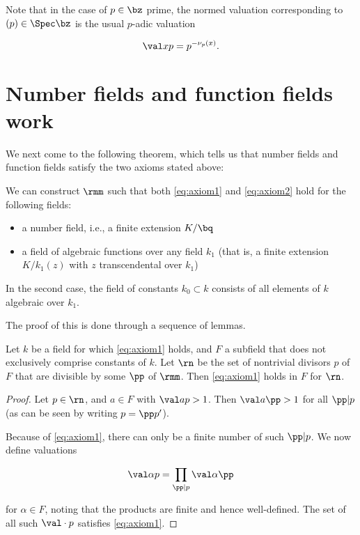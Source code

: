 Note that in the case of $p\in\bz$ prime, the normed valuation corresponding to
$(p)\in\Spec\bz$ is the usual $p$-adic valuation

\[ \val x p = p^{-\nu_p(x)}. \]

\section{Number fields and function fields work}
We next come to the following theorem, which tells us that number fields and
function fields satisfy the two axioms stated above:

\begin{thm}
  \label{thm:works}
  We can construct $\rmm$ such that both \ref{eq:axiom1} and \ref{eq:axiom2} hold
  for the following fields:
  \begin{itemize}
  \item a number field, i.e., a finite extension $K/\bq$
  \item a field of algebraic functions over any field $k_1$ (that is, a finite
    extension $K/k_1(z)$ with $z$ transcendental over $k_1$)
  \end{itemize}
  In the second case, the field of constants $k_0 \subset k$ consists of all
  elements of $k$ algebraic over $k_1$.
\end{thm}

The proof of this is done through a sequence of lemmas.

\begin{lemma}
  Let $k$ be a field for which \ref{eq:axiom1} holds, and $F$ a subfield that
  does not exclusively comprise constants of $k$. Let $\rn$ be the set of
  nontrivial divisors $p$ of $F$ that are divisible by some $\pp$ of $\rmm$.
  Then \ref{eq:axiom1} holds in $F$ for $\rn$.
\end{lemma}

\begin{proof}
  Let $p \in\rn$, and $a\in F$ with $\val a p > 1$. Then $\val a \pp > 1$ for all
  $\pp|p$ (as can be seen by writing $p = \pp p'$).

  Because of \ref{eq:axiom1}, there can only be a finite number of such
  $\pp|p$. We now define valuations

  \[ \val \alpha p = \prod_{\pp|p} \val \alpha \pp \]

  for $\alpha\in F$, noting that the products are finite and hence well-defined.
  The set of all such $\val \cdot p$ satisfies \ref{eq:axiom1}.
\end{proof}

